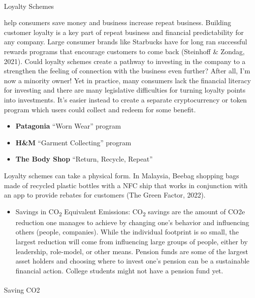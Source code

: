 \documentclass[
  letterpaper,
  DIV=11,
  numbers=noendperiod]{scrartcl}
\makeatletter
\let\oldparagraph\paragraph
\renewcommand{\paragraph}{
    \@ifstar
      \xxxParagraphStar
      \xxxParagraphNoStar
  }
\newcommand{\xxxParagraphStar}[1]{\oldparagraph*{#1}\mbox{}}
\newcommand{\xxxParagraphNoStar}[1]{\oldparagraph{#1}\mbox{}}
\providecommand{\tightlist}{%
  \setlength{\itemsep}{0pt}\setlength{\parskip}{0pt}}\usepackage{longtable,booktabs,array}
\makeatother
\begin{document}
\paragraph{Loyalty Schemes}\label{loyalty-schemes}

help consumers save money and business increase repeat business.
Building customer loyalty is a key part of repeat business and financial
predictability for any company. Large consumer brands like Starbucks
have for long ran successful rewards programs that encourage customers
to come back (Steinhoff \& Zondag, 2021). Could loyalty schemes create a
pathway to investing in the company to a strengthen the feeling of
connection with the business even further? After all, I'm now a minority
owner! Yet in practice, many consumers lack the financial literacy for
investing and there are many legislative difficulties for turning
loyalty points into investments. It's easier instead to create a
separate cryptocurrency or token program which users could collect and
redeem for some benefit.

\begin{itemize}
\item
  \textbf{Patagonia} ``Worn Wear'' program
\item
  \textbf{H\&M} ``Garment Collecting'' program
\item
  \textbf{The Body Shop} ``Return, Recycle, Repeat''
\end{itemize}

Loyalty schemes can take a physical form. In Malaysia, Beebag shopping
bags made of recycled plastic bottles with a NFC ship that works in
conjunction with an app to provide rebates for customers (The Green
Factor, 2022).

\begin{itemize}
\tightlist
\item
  Savings in CO\textsubscript{2} Equivalent Emissions:
  CO\textsubscript{2} savings are the amount of CO2e reduction one
  manages to achieve by changing one's behavior and influencing others
  (people, companies). While the individual footprint is so small, the
  largest reduction will come from influencing large groups of people,
  either by leadership, role-model, or other means. Pension funds are
  some of the largest asset holders and choosing where to invest one's
  pension can be a sustainable financial action. College students might
  not have a pension fund yet.
\end{itemize}

\paragraph{Saving CO2}\label{saving-co2}
\end{document}
